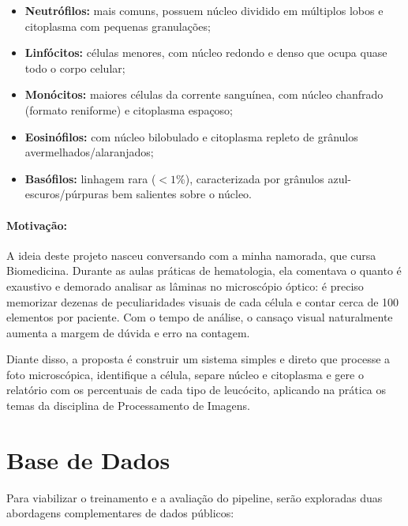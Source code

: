 \documentclass[12pt, a4paper]{article}
\begin{document}
\begin{itemize}
    \item \textbf{Neutr\'{o}filos:} mais comuns, possuem n\'{u}cleo dividido em m\'{u}ltiplos lobos e citoplasma com pequenas granula\c{c}\~{o}es;
    \item \textbf{Linf\'{o}citos:} c\'{e}lulas menores, com n\'{u}cleo redondo e denso que ocupa quase todo o corpo celular;
    \item \textbf{Mon\'{o}citos:} maiores c\'{e}lulas da corrente sangu\'{i}nea, com n\'{u}cleo chanfrado (formato reniforme) e citoplasma espa\c{c}oso;
    \item \textbf{Eosin\'{o}filos:} com n\'{u}cleo bilobulado e citoplasma repleto de gr\^{a}nulos avermelhados/alaranjados;
    \item \textbf{Bas\'{o}filos:} linhagem rara ($<1\%$), caracterizada por gr\^{a}nulos azul-escuros/p\'{u}rpuras bem salientes sobre o n\'{u}cleo.
\end{itemize}

\paragraph{Motiva\c{c}\~{a}o:}
A ideia deste projeto nasceu conversando com a minha namorada, que cursa Biomedicina. Durante as aulas pr\'{a}ticas de hematologia, ela comentava o quanto \'{e} exaustivo e demorado analisar as l\^{a}minas no microsc\'{o}pio \'{o}ptico: \'{e} preciso memorizar dezenas de peculiaridades visuais de cada c\'{e}lula e contar cerca de 100 elementos por paciente. Com o tempo de an\'{a}lise, o cansa\c{c}o visual naturalmente aumenta a margem de d\'{u}vida e erro na contagem.

Diante disso, a proposta \'{e} construir um sistema simples e direto que processe a foto microsc\'{o}pica, identifique a c\'{e}lula, separe n\'{u}cleo e citoplasma e gere o relat\'{o}rio com os percentuais de cada tipo de leuc\'{o}cito, aplicando na pr\'{a}tica os temas da disciplina de Processamento de Imagens.

\section{Base de Dados}

Para viabilizar o treinamento e a avalia\c{c}\~{a}o do pipeline, ser\~{a}o exploradas duas abordagens complementares de dados p\'{u}blicos:
\end{document}
